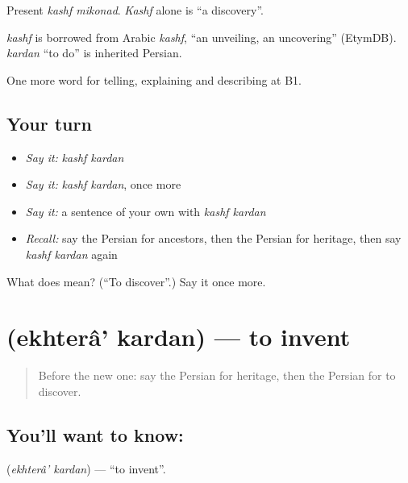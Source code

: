 Present \emph{kashf mikonad}. \emph{Kashf} alone is \textquotedblleft{}a discovery\textquotedblright{}.

\begin{cousinweb}
\emph{kashf} is borrowed from Arabic \emph{kashf}, \textquotedblleft{}an unveiling, an uncovering\textquotedblright{} (EtymDB). \emph{kardan} \textquotedblleft{}to do\textquotedblright{} is inherited Persian.
\end{cousinweb}

\begin{grammarlens}[title={What you've built}]
One more word for telling, explaining and describing at B1.
\end{grammarlens}

\subsection*{Your turn}
\begin{itemize}
\raggedright
  \item \emph{Say it:} \emph{kashf kardan}
  \item \emph{Say it:} \emph{kashf kardan}, once more
  \item \emph{Say it:} a sentence of your own with \emph{kashf kardan}
  \item \emph{Recall:} say the Persian for ancestors, then the Persian for heritage, then say \emph{kashf kardan} again
\end{itemize}

\begin{tcolorbox}[breakable,colback=teal!4,colframe=teal!35!black,title={Before you move on}]
What does   mean? (\textquotedblleft{}To discover\textquotedblright{}.) Say it once more.
\end{tcolorbox}
\section[\texorpdfstring{\fa{اختراع} \fa{کردن} (ekhterâ' kardan)}{اختراع کردن (ekhterâ' kardan)}]{  (ekhterâ' kardan) — to invent}

\label{lesson:FA-C354-ekhtera-kardan}



\begin{quote}
Before the new one: say the Persian for heritage, then the Persian for to discover.
\end{quote}

\subsection*{You'll want to know:  }
\textbf{ } (\emph{ekhterâ' kardan}) — \textquotedblleft{}to invent\textquotedblright{}.

